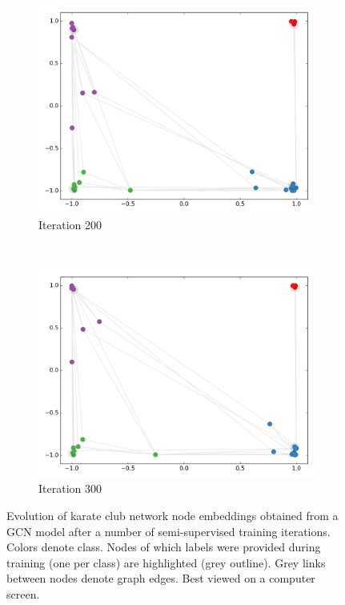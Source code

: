 \documentclass{article} %
\begin{document}
\begin{figure}[htbp]
\begin{subfigure}[b]{0.5\textwidth}
    \includegraphics[width=\textwidth, trim={0 1.5cm 0 0}, clip]{anim_lines-200.png}
    \caption{Iteration 200}
    \label{fig:semi-emb-e}
\end{subfigure}%
~
\begin{subfigure}[b]{0.5\textwidth}
    \centering
    \includegraphics[width=\textwidth, trim={0 1.5cm 0 0}, clip]{anim_lines-300.png}
    \caption{Iteration 300}
    \label{fig:semi-emb-f}
\end{subfigure}
\caption{Evolution of karate club network node embeddings obtained from a GCN model after a number of semi-supervised training iterations. Colors denote class. Nodes of which labels were provided during training (one per class) are highlighted (grey outline). Grey links between nodes denote graph edges. Best viewed on a computer screen.}
\label{fig:semi-emb}
\end{figure}
\end{document}
